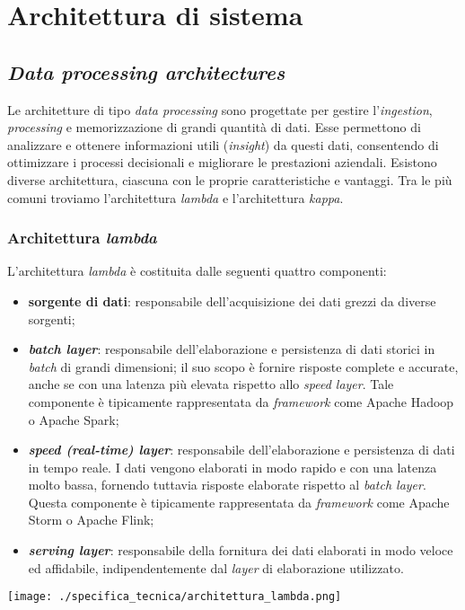 \section{Architettura di sistema}
\subsection{\textit{Data processing architectures}}
Le architetture di tipo \textit{data processing} sono progettate per gestire l'\textit{ingestion}, \textit{processing} e memorizzazione di grandi quantità di dati.
Esse permettono di analizzare e ottenere informazioni utili (\textit{insight}) da questi dati, consentendo di ottimizzare i processi decisionali e migliorare le prestazioni aziendali.
Esistono diverse architettura, ciascuna con le proprie caratteristiche e vantaggi. Tra le più comuni troviamo l'architettura \textit{lambda} e l'architettura \textit{kappa}.

\subsubsection{Architettura \textit{lambda}}
L'architettura \textit{lambda} è costituita dalle seguenti quattro componenti:
\begin{itemize}
	\item \textbf{sorgente di dati}: responsabile dell'acquisizione dei dati grezzi da diverse sorgenti;
	\item \textbf{\textit{batch layer}}: responsabile dell'elaborazione e persistenza di dati storici in \textit{batch} di grandi dimensioni; il suo scopo è fornire risposte complete e accurate, anche se con una latenza più elevata rispetto allo \textit{speed layer}. Tale componente è tipicamente rappresentata da \textit{framework} come Apache Hadoop o Apache Spark;
	\item \textbf{\textit{speed (real-time) layer}}: responsabile dell'elaborazione e persistenza di dati in tempo reale. I dati vengono elaborati in modo rapido e con una latenza molto bassa, fornendo tuttavia risposte elaborate rispetto al \textit{batch layer}. Questa componente è tipicamente rappresentata da \textit{framework} come Apache Storm o Apache Flink;
	\item \textbf{\textit{serving layer}}: responsabile della fornitura dei dati elaborati in modo veloce ed affidabile, indipendentemente dal \textit{layer} di elaborazione utilizzato.
\end{itemize}

\begin{center}
	\texttt{[image: ./specifica\_tecnica/architettura\_lambda.png]}
\end{center}

